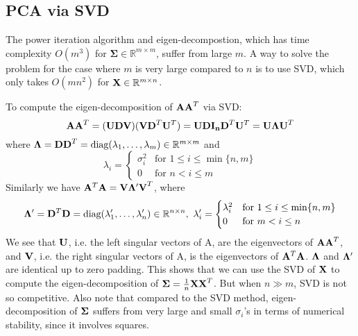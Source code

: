 \documentclass[../book-template.tex]{subfiles}
\begin{document}
\subsection{PCA via SVD}
The power iteration algorithm and eigen-decompostion, which has time complexity $O(m^3)$ for $\bm{\Sigma}\in\mathbb{R}^{m\times m}$, suffer from large $m$. A way to solve the problem for the case where $m$ is very large compared to $n$ is to use SVD, which only takes $O(mn^2)$ for ${\bf X}\in \mathbb{R}^{m\times n}$.
\par To compute the eigen-decomposition of ${\bf AA}^T$ via SVD:
\begin{equation*}
    {\bf AA}^T = ({\bf UDV})({\bf VD}^T{\bf U}^T) = {\bf UDI_nD}^T{\bf U}^T = {\bf U\Lambda U}^T
\end{equation*}
where ${\bf \Lambda} = {\bf DD}^T=\text{diag}(\lambda_1,\dots,\lambda_m)\in\mathbb{R}^{m\times m}$ and
\begin{equation*}
\lambda_i=\begin{cases}
\sigma_i^2& \text{for }1\leq i \leq \min\{n,m\}\\
0& \text{for }n< i \leq m
\end{cases}
\end{equation*}
Similarly we have ${\bf A}^T{\bf A}={\bf V\Lambda'V}^T$, where
\begin{equation*}
    {\bf \Lambda'} = {\bf D}^T{\bf D} = \text{diag}(\lambda'_1,\dots,\lambda'_n)\in\mathbb{R}^{n\times n},\ \lambda'_i=\begin{cases}
\lambda_i^2& \text{for }1\leq i \leq \min\{n,m\}\\
0& \text{for }m< i \leq n
\end{cases}
\end{equation*}
We see that ${\bf U}$, i.e. the left singular vectors of A, are the eigenvectors of ${\bf AA}^T$, and ${\bf V}$, i.e. the right singular vectors of A, is the eigenvectors of ${\bf A}^T{\bf A}$. ${\bf \Lambda}$ and ${\bf \Lambda'}$ are identical up to zero padding. This shows that we can use the SVD of ${\bf X}$ to compute the eigen-decomposition of ${\bf \Sigma}=\frac{1}{n}{\bf XX}^T$. But when $n \gg m$, SVD is not so competitive. Also note that compared to the SVD method, eigen-decomposition of ${\bf \Sigma}$ suffers from very large and small $\sigma_i$'s in terms of numerical stability, since it involves squares.
\end{document}
